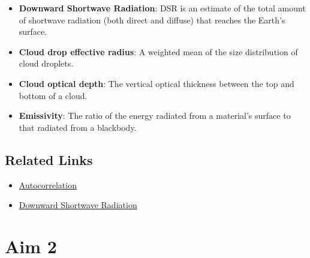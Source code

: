 \documentclass{article}
\begin{document}
\begin{itemize}
{\begin{itemize}
            \item \textbf{Downward Shortwave Radiation}: DSR is an estimate of the total amount of shortwave radiation (both direct and diffuse) that reaches the Earth’s surface.
            \item \textbf{Cloud drop effective radius}: A weighted mean of the size distribution of cloud droplets.
            \item \textbf{Cloud optical depth}: The vertical optical thickness between the top and bottom of a cloud.
            \item \textbf{Emissivity}: The ratio of the energy radiated from a material's surface to that radiated from a blackbody.
        \end{itemize}
    }
\end{itemize}

\subsection*{Related Links}
\begin{itemize}
    \item \href{https://itl.nist.gov/div898/handbook/eda/section3/eda35c.htm}{Autocorrelation}
    \item \href{https://www.goes-r.gov/products/baseline-DSR.html}{Downward Shortwave Radiation}
\end{itemize}


\section{Aim 2}
\end{document}
